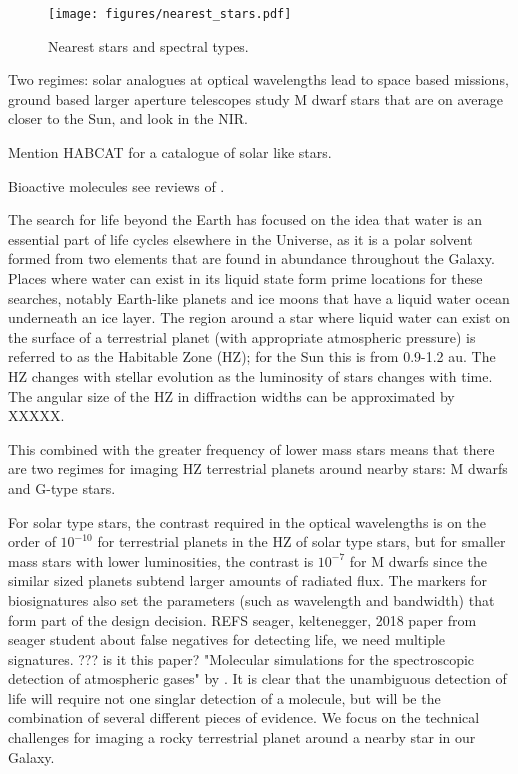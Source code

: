 \documentclass[letterpaper]{ar-1col}
\begin{document}
\begin{figure}[ht]
  \centering
  \texttt{[image: figures/nearest\_stars.pdf]}
  \caption{Nearest stars and spectral types.}
  \label{fig:nstars}
\end{figure}

Two regimes: solar analogues at optical wavelengths lead to space based missions, ground based larger aperture telescopes study M dwarf stars that are on average closer to the Sun, and look in the NIR.

Mention HABCAT for a catalogue of solar like stars.

Bioactive molecules see reviews of \citet{2016AsBio..16..465S,2017ARAA..55..433K,2018AsBio..18..663S}.

The search for life beyond the Earth has focused on the idea that water is an essential part of life cycles elsewhere in the Universe, as it is a polar solvent formed from two elements that are found in abundance throughout the Galaxy.
%
Places where water can exist in its liquid state form prime locations for these searches, notably Earth-like planets and ice moons that have a liquid water ocean underneath an ice layer.
%
The region around a star where liquid water can exist on the surface of a terrestrial planet (with appropriate atmospheric pressure) is referred to as the Habitable Zone (HZ); for the Sun this is from 0.9-1.2 au.
%
The HZ changes with stellar evolution as the luminosity of stars changes with time.
%
The angular size of the HZ in diffraction widths can be approximated by XXXXX. 


This combined with the greater frequency of lower mass stars means that there are two regimes for imaging HZ terrestrial planets around nearby stars: M dwarfs and G-type stars.

For solar type stars, the contrast required in the optical wavelengths is on the order of $10^{-10}$ for terrestrial planets in the HZ of solar type stars, but for smaller mass stars with lower luminosities, the contrast is $10^{-7}$ for M dwarfs since the similar sized planets subtend larger amounts of radiated flux.
%
The markers for biosignatures also set the parameters (such as wavelength and bandwidth) that form part of the design decision.
%
REFS seager, keltenegger, 2018 paper from seager student about false negatives for detecting life, we need multiple signatures. ??? is it this paper? "Molecular simulations for the spectroscopic detection of atmospheric gases" by \citet{Sousa-Silva19}.
%
It is clear that the unambiguous detection of life will require not one singlar detection of a molecule, but will be the combination of several different pieces of evidence.
%
We focus on the technical challenges for imaging a rocky terrestrial planet around a nearby star in our Galaxy.
\end{document}
